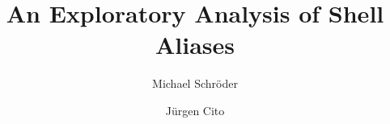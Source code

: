 \documentclass[sigconf,review]{acmart}
\begin{document}
\title{An Exploratory Analysis of Shell Aliases}

\author{Michael Schröder}

\author{Jürgen Cito}

\begin{abstract}
	
\end{abstract}

\maketitle
















%
\end{document}
